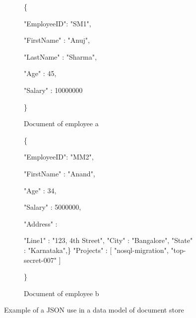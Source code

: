  \begin{figure}[H]
\begin{subfigure}{.5\textwidth}
  \centering
    {\{}
    
{"EmployeeID": "SM1",}

{"FirstName" : "Anuj",}

{"LastName" : "Sharma",}

{"Age" : 45, }

{"Salary" : 10000000} 

{\}}
  \caption{Document of employee a}
  \label{fig:sfig1}
\end{subfigure}%
\begin{subfigure}{.5\textwidth}
  \centering
  {\{}
  
{"EmployeeID": "MM2",}

{"FirstName" : "Anand",}

{"Age" : 34,}

{"Salary" : 5000000,}

{"Address" : {
"Line1" : "123, 4th Street",
"City" : "Bangalore",
"State" : "Karnataka",\}
{"Projects" : [
"nosql-migration",
"top-secret-007"
]}

{\}}}}


  \caption{Document of employee b}
  \label{fig:sfig2}
\end{subfigure}
 \caption{Example of a JSON use in a data model of document store}
\label{fig:docexample}
\end{figure}
